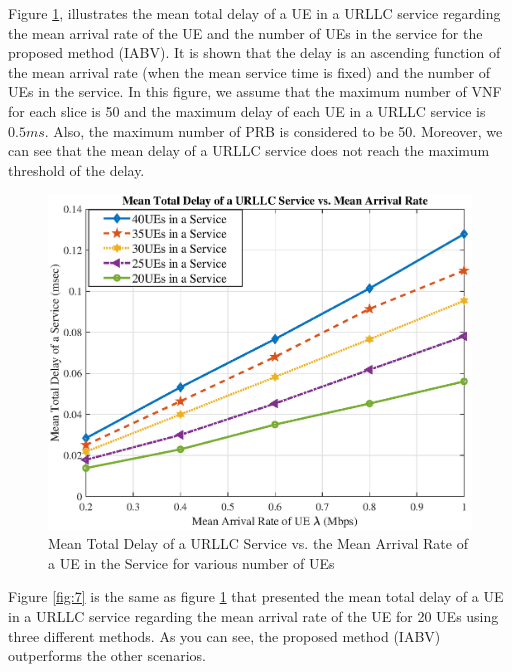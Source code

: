 \documentclass[conference]{IEEEtran}
\begin{document}
Figure \ref{fig:6}, illustrates the mean total delay of a UE in a URLLC service regarding the mean arrival rate of the UE and the number of UEs in the service for the proposed method (IABV).
It is shown that the delay is an ascending function of the mean arrival rate (when the mean service time is fixed) and the number of UEs in the service. In this figure, we assume that the maximum number of VNF for each slice is 50 and the maximum delay of each UE in a URLLC service is $0.5ms$. Also, the maximum number of PRB is considered to be 50. 
 Moreover, we can see that the mean delay of a URLLC service 
does not reach the maximum threshold of the delay.
\begin{figure}
  \centering 
    \includegraphics[scale = 0.47]{delay_new.eps}
  \caption{Mean Total Delay of a URLLC Service vs. the Mean Arrival Rate of a UE in the Service for various number of UEs}
  \label{fig:6}
\end{figure}
Figure \ref{fig:7} is the same as figure \ref{fig:6} that presented the mean total delay of a UE in a URLLC service regarding the mean arrival rate of the UE for 20 UEs using three different methods. As you can see, the proposed method (IABV) outperforms the other scenarios.
\end{document}

